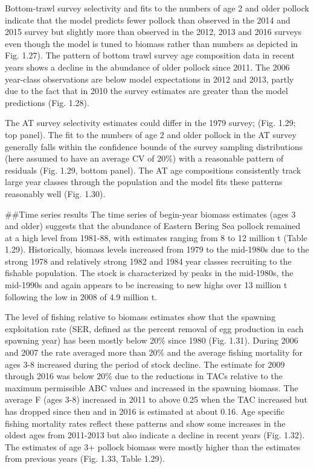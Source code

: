 Bottom-trawl survey selectivity and fits to the numbers of age 2 and
older pollock indicate that the model predicts fewer pollock than
observed in the 2014 and 2015 survey but slightly more than observed in
the 2012, 2013 and 2016 surveys even though the model is tuned to
biomass rather than numbers as depicted in Fig. 1.27). The pattern of
bottom trawl survey age composition data in recent years shows a decline
in the abundance of older pollock since 2011. The 2006 year-class
observations are below model expectations in 2012 and 2013, partly due
to the fact that in 2010 the survey estimates are greater than the model
predictions (Fig. 1.28).

The AT survey selectivity estimates could differ in the 1979 survey;
(Fig. 1.29; top panel). The fit to the numbers of age 2 and older
pollock in the AT survey generally falls within the confidence bounds of
the survey sampling distributions (here assumed to have an average CV of
20\%) with a reasonable pattern of residuals (Fig. 1.29, bottom panel).
The AT age compositions consistently track large year classes through
the population and the model fits these patterns reasonably well (Fig.
1.30).

\#\#Time series results The time series of begin-year biomass estimates
(ages 3 and older) suggests that the abundance of Eastern Bering Sea
pollock remained at a high level from 1981-88, with estimates ranging
from 8 to 12 million t (Table 1.29). Historically, biomass levels
increased from 1979 to the mid-1980s due to the strong 1978 and
relatively strong 1982 and 1984 year classes recruiting to the fishable
population. The stock is characterized by peaks in the mid-1980s, the
mid-1990s and again appears to be increasing to new highs over 13
million t following the low in 2008 of 4.9 million t.

The level of fishing relative to biomass estimates show that the
spawning exploitation rate (SER, defined as the percent removal of egg
production in each spawning year) has been mostly below 20\% since 1980
(Fig. 1.31). During 2006 and 2007 the rate averaged more than 20\% and
the average fishing mortality for ages 3-8 increased during the period
of stock decline. The estimate for 2009 through 2016 was below 20\% due
to the reductions in TACs relative to the maximum permissible ABC values
and increased in the spawning biomass. The average F (ages 3-8)
increased in 2011 to above 0.25 when the TAC increased but has dropped
since then and in 2016 is estimated at about 0.16. Age specific fishing
mortality rates reflect these patterns and show some increases in the
oldest ages from 2011-2013 but also indicate a decline in recent years
(Fig. 1.32). The estimates of age 3+ pollock biomass were mostly higher
than the estimates from previous years (Fig. 1.33, Table 1.29).

